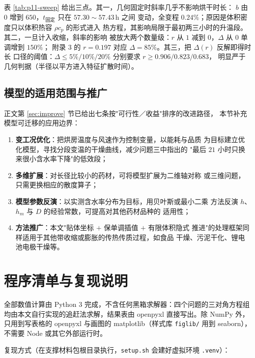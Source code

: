 \documentclass[12pt,a4paper,fontset=none]{ctexart}
\begin{document}
表 \ref{tab:p11-sweep} 给出三点。其一，几何固定时斜率几乎不影响烘干时长：
$b$ 由 $0$ 增到 $650$，$t_{\text{固定}}$ 只在 $57.30\sim57.43$\,h 之间
变动，全变程 $0.24\%$；原因是体积密度只以体积热容 $\rho c_p$ 的形式进入
热方程，其影响局限于最初两三小时的升温段。其二，一旦计入收缩，斜率的影响
被放大两个数量级：$r$ 从 $1$ 减到 $0$，$\Delta$ 从 $0$ 单调增到 $150\%$；
附录 3 的 $r=0.197$ 对应 $\Delta=85\%$。其三，把 $\Delta(r)$ 反解即得时长
口径的阈值：$\Delta\le5\%/10\%/20\%$ 分别要求 $r\ge0.906/0.823/0.683$，
明显严于几何判据（半径以平方进入特征扩散时间）。

\subsection{模型的适用范围与推广}
\label{app:promotion}

正文第 \ref{sec:improve} 节已给出七条按"可行性／收益"排序的改进路径，
本节补充模型可迁移的应用边界：

\begin{enumerate}
  \item \textbf{变工况优化}：把烘房温度与风速作为控制变量，以能耗与品质
        为目标建立优化模型，寻找分段变温的干燥曲线，减少问题三中指出的
        "最后 $21$ 小时只换来很小含水率下降"的低效段；
  \item \textbf{多维扩展}：对长径比较小的药材，可将模型扩展为二维轴对称
        或三维问题，只需更换相应的散度算子；
  \item \textbf{模型参数反演}：以实测含水率分布为目标，用贝叶斯或最小二乘
        方法反演 $h$、$h_m$ 与 $D$ 的经验常数，可提高对其他药材品种的
        适用性；
  \item \textbf{方法推广}：本文"贴体坐标 $+$ 保单调插值 $+$ 有限体积隐式
        推进"的处理框架同样适用于其他带收缩或膨胀的传热传质过程，如食品
        干燥、污泥干化、锂电池电极干燥等。
\end{enumerate}

\section{程序清单与复现说明}

全部数值计算由 Python 3 完成，不含任何黑箱求解器：四个问题的三对角方程组
均由本文自行实现的追赶法求解，结果表由 openpyxl 直接写出。除 NumPy 外，
只用到写表格的 openpyxl 与画图的 matplotlib（样式库 \texttt{figlib/} 用到
seaborn），不需要 Node 或其它外部运行时。

复现方式（在支撑材料包根目录执行，\texttt{setup.sh} 会建好虚拟环境
\texttt{.venv}）：
\end{document}
